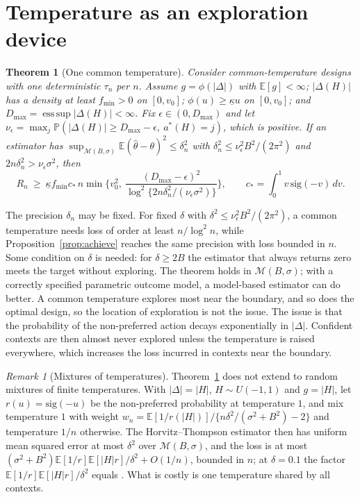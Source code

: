 \documentclass[12pt]{article}
\newtheorem{theorem}{Theorem}
\theoremstyle{definition}
\theoremstyle{remark}
\newtheorem{remark}{Remark}
\newcommand{\E}{\mathbb{E}}
\newcommand{\Prob}{\mathbb{P}}
\newcommand{\M}{\mathcal{M}}
\newcommand{\sgm}{\mathrm{sig}}
\DeclareMathOperator*{\esssup}{ess\,sup}
\begin{document}
\section{Temperature as an exploration device}\label{sec:temperature}

\begin{theorem}[One common temperature]\label{thm:common}
Consider common-temperature designs with one deterministic $\tau_n$ per $n$.
Assume $g=\phi(|\Delta|)$ with $\E[g]<\infty$; $|\Delta(H)|$ has a density at least
$f_{\min}>0$ on $[0,v_0]$; $\phi(u)\ge\underline\kappa u$ on $[0,v_0]$; and
$D_{\max}=\esssup|\Delta(H)|<\infty$. Fix $\epsilon\in(0,D_{\max})$ and let
$\nu_\epsilon=\max_j\Prob(|\Delta(H)|\ge D_{\max}-\epsilon,\ a^*(H)=j)$, which is
positive. If an estimator has $\sup_{\M(B,\sigma)}\E(\hat\theta-\theta)^2\le\delta_n^2$
with $\delta_n^2\le\nu_\epsilon^2B^2/(2\pi^2)$ and $2n\delta_n^2>\nu_\epsilon\sigma^2$,
then
\[
R_n\ \ge\ \underline\kappa f_{\min}c_*\,n\min\Big\{v_0^2,\ \frac{(D_{\max}-\epsilon)^2}{\log^2\{2n\delta_n^2/(\nu_\epsilon\sigma^2)\}}\Big\},
\qquad c_*=\int_0^1v\,\sgm(-v)\,dv .
\]
\end{theorem}

The precision $\delta_n$ may be fixed. For fixed $\delta$ with
$\delta^2\le\nu_\epsilon^2B^2/(2\pi^2)$, a common temperature needs loss of order at
least $n/\log^2n$, while Proposition~\ref{prop:achieve} reaches the same precision with
loss bounded in $n$. Some condition on $\delta$ is needed: for $\delta\ge2B$ the
estimator that always returns zero meets the target without exploring. The theorem
holds in $\M(B,\sigma)$; with a correctly specified parametric outcome model, a
model-based estimator can do better. A common temperature explores most near the
boundary, and so does the optimal design, so the location of exploration is not the
issue. The issue is that the probability of the non-preferred action decays
exponentially in $|\Delta|$. Confident contexts are then almost never explored unless
the temperature is raised everywhere, which increases the loss incurred in contexts
near the boundary.

\begin{remark}[Mixtures of temperatures]\label{rem:mixture}
Theorem~\ref{thm:common} does not extend to random mixtures of finite temperatures.
With $|\Delta|=|H|$, $H\sim U(-1,1)$ and $g=|H|$, let $r(u)=\sgm(-u)$ be the
non-preferred probability at temperature $1$, and mix temperature $1$ with weight
$w_n=\E[1/r(|H|)]/\{n\delta^2/(\sigma^2+B^2)-2\}$ and temperature $1/n$ otherwise.
The Horvitz--Thompson estimator then has uniform mean squared error at most
$\delta^2$ over $\M(B,\sigma)$, and the loss is at most
$(\sigma^2+B^2)\E[1/r]\E[|H|r]/\delta^2+O(1/n)$, bounded in $n$; at $\delta=0.1$ the
factor $\E[1/r]\E[|H|r]/\delta^2$ equals \mixtureCost{}. What is costly is one
temperature shared by all contexts.
\end{remark}
\end{document}
